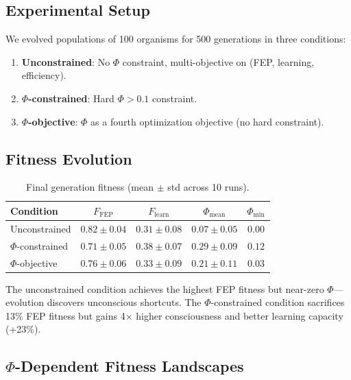 \documentclass[11pt,a4paper]{article}
\begin{document}
\subsection{Experimental Setup}

We evolved populations of 100 organisms for 500 generations in three conditions:

\begin{enumerate}[nosep]
    \item \textbf{Unconstrained}: No $\Phi$ constraint, multi-objective on (FEP, learning, efficiency).
    \item \textbf{$\Phi$-constrained}: Hard $\Phi > 0.1$ constraint.
    \item \textbf{$\Phi$-objective}: $\Phi$ as a fourth optimization objective (no hard constraint).
\end{enumerate}

\subsection{Fitness Evolution}

\begin{table}[h]
\centering
\caption{Final generation fitness (mean $\pm$ std across 10 runs).}
\label{tab:fitness}
\begin{tabular}{@{}lcccc@{}}
\toprule
Condition & $F_{\text{FEP}}$ & $F_{\text{learn}}$ & $\Phi_{\text{mean}}$ & $\Phi_{\text{min}}$ \\
\midrule
Unconstrained & $0.82 \pm 0.04$ & $0.31 \pm 0.08$ & $0.07 \pm 0.05$ & $0.00$ \\
$\Phi$-constrained & $0.71 \pm 0.05$ & $0.38 \pm 0.07$ & $0.29 \pm 0.09$ & $0.12$ \\
$\Phi$-objective & $0.76 \pm 0.06$ & $0.33 \pm 0.09$ & $0.21 \pm 0.11$ & $0.03$ \\
\bottomrule
\end{tabular}
\end{table}

The unconstrained condition achieves the highest FEP fitness but near-zero $\Phi$---evolution discovers unconscious shortcuts. The $\Phi$-constrained condition sacrifices 13\% FEP fitness but gains 4$\times$ higher consciousness and better learning capacity (+23\%).

\subsection{$\Phi$-Dependent Fitness Landscapes}
\end{document}
